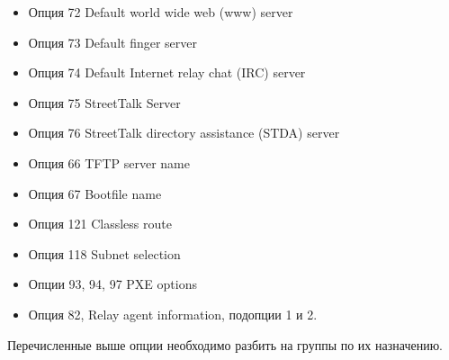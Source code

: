 \documentclass[14pt,a4paper]{extarticle}
\begin{document}
\begin{itemize}
    \item Опция 72 Default world wide web (www) server
    \item Опция 73 Default finger server
    \item Опция 74 Default Internet relay chat (IRC) server
    \item Опция 75 StreetTalk Server
    \item Опция 76 StreetTalk directory assistance (STDA) server
    \item Опция 66 TFTP server name
    \item Опция 67 Bootfile name
    \item Опция 121 Classless route \cite{rfc3442}
    \item Опция 118 Subnet selection \cite{rfc3011}
    \item Опции 93, 94, 97 PXE options \cite{rfc4578}
    \item Опция 82, Relay agent information, подопции 1 и 2.
\end{itemize}

Перечисленные выше опции необходимо разбить на группы по их назначению.
\end{document}
